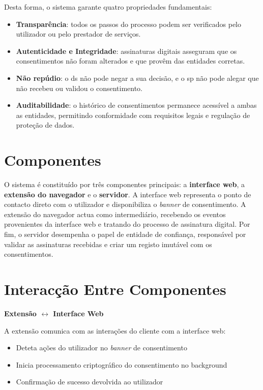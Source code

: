 Desta forma, o sistema garante quatro propriedades fundamentais: 

\begin{itemize}
    \item \textbf{Transparência}: todos os passos do processo podem ser verificados pelo utilizador ou pelo prestador de serviços.
    \item \textbf{Autenticidade e Integridade}: assinaturas digitais asseguram que os consentimentos não foram alterados e que provêm das entidades corretas.
    \item \textbf{Não repúdio}: o \acrshort{ds} não pode negar a sua decisão, e o \acrshort{sp} não pode alegar que não recebeu ou validou o consentimento.
    \item \textbf{Auditabilidade}: o histórico de consentimentos permanece acessível a ambas as entidades, permitindo conformidade com requisitos legais e regulação de proteção de dados.
\end{itemize}

\section{Componentes}

O sistema é constituído por três componentes principais: a \textbf{interface web}, a \textbf{extensão do navegador} e o \textbf{servidor}.
A interface web representa o ponto de contacto direto com o utilizador e disponibiliza o \textit{banner} de consentimento.
A extensão do navegador actua como intermediário, recebendo os eventos provenientes da interface web e tratando do processo de assinatura digital.
Por fim, o servidor desempenha o papel de entidade de confiança, responsável por validar as assinaturas recebidas e criar um registo imutável com os consentimentos.

\section{Interacção Entre Componentes}

\quad \textbf{Extensão $\leftrightarrow$ Interface Web}

A extensão comunica com as interações do cliente com a interface web: 
\begin{itemize}
    \item Deteta ações do utilizador no \textit{banner} de consentimento
    \item Inicia processamento criptográfico do consentimento no background
    \item Confirmação de sucesso devolvida ao utilizador
\end{itemize}

